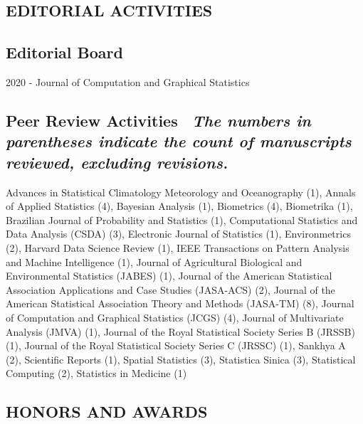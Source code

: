 \documentclass[10pt]{article}
\begin{document}
\subsection*{EDITORIAL ACTIVITIES}

\smallskip

\subsection*{Editorial Board} 2020 - \quad \quad Journal of Computation and Graphical Statistics

\subsection*{Peer Review Activities \ {\small \em  The numbers in parentheses indicate the count of manuscripts reviewed, excluding revisions.}} 
Advances in Statistical Climatology Meteorology and Oceanography (1), Annals of Applied Statistics (4), Bayesian Analysis (1), Biometrics (4), Biometrika (1), Brazilian Journal of Probability and Statistics (1), Computational Statistics and Data Analysis (CSDA) (3), Electronic Journal of Statistics (1), Environmetrics (2), Harvard Data Science Review (1), IEEE Transactions on Pattern Analysis and Machine Intelligence (1), Journal of Agricultural Biological and Environmental Statistics (JABES) (1), Journal of the American Statistical Association Applications and Case Studies (JASA-ACS) (2), Journal of the American Statistical Association Theory and Methods (JASA-TM) (8), Journal of Computation and Graphical Statistics (JCGS) (4), Journal of Multivariate Analysis (JMVA) (1), Journal of the Royal Statistical Society Series B (JRSSB) (1), 
Journal of the Royal Statistical Society Series C (JRSSC) (1), Sankhya A (2), Scientific Reports (1), Spatial Statistics (3), Statistica Sinica (3), Statistical Computing (2), Statistics in Medicine (1)

\subsection*{HONORS AND AWARDS}
\end{document}
